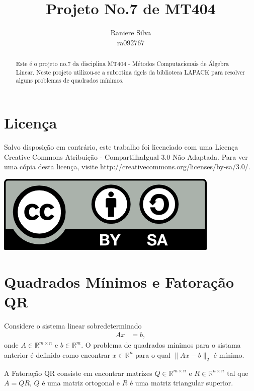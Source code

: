 \documentclass[12pt,a4paper]{article}
\begin{document}
\title{Projeto No.7 de MT404}
\author{Raniere Silva \\ ra092767}
\maketitle
\begin{abstract}
    Este \'{e} o projeto no.7 da disciplina MT404 - M\'{e}todos Computacionais
    de \'{A}lgebra Linear. Neste projeto utilizou-se a subrotina dgels da
    biblioteca LAPACK para resolver alguns problemas de quadrados mínimos.
\end{abstract}
\tableofcontents
\lstlistoflistings
\section*{Licen\c{c}a}
Salvo disposi\c{c}\~{a}o em contr\'{a}rio, este trabalho foi licenciado com uma
Licen\c{c}a Creative Commons Atribui\c{c}\~{a}o - CompartilhaIgual 3.0 N\~{a}o
Adaptada. Para ver uma c\'{o}pia desta licen\c{c}a, visite
http://creativecommons.org/licenses/by-sa/3.0/.
\begin{center}
    \includegraphics{../figuras/cc-by-sa.png}
\end{center}
\newpage
\section{Quadrados Mínimos e Fatoração QR}
Considere o sistema linear sobredeterminado
\begin{align*}
    A x & = b,
\end{align*}
onde $A \in \mathbb{R}^{m \times n}$ e $b \in \mathbb{R}^m$. O problema de
quadrados mínimos para o sistama anterior é definido como encontrar $x \in
\mathbb{R}^n$ para o qual $\| A x - b \|_2$ é mínimo.

A Fatoração QR consiste em encontrar matrizes $Q \in \mathbb{R}^{m \times n}$ e
$R \in \mathbb{R}^{n \times n}$ tal que $A = QR$, $Q$ é uma matriz
ortogonal e $R$ é uma matriz triangular superior.
\end{document}
